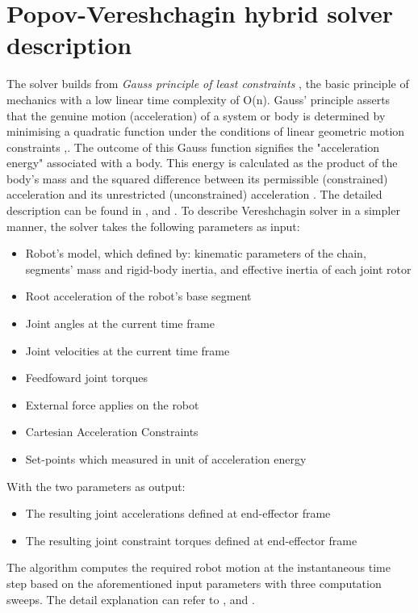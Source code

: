 \documentclass[report.tex]{subfiles}
\begin{document}
    \section{Popov-Vereshchagin hybrid solver description}
    The solver builds from \textit{Gauss principle of least constraints} , the basic principle of mechanics with a low linear time complexity of O(n). Gauss' principle asserts that the genuine motion (acceleration) of a system or body is determined by minimising a quadratic function under the conditions of linear geometric motion constraints \cite{bruyninckx2000gauss},\cite{gauss1829neues}. The outcome of this Gauss function signifies the "acceleration energy" associated with a body. This energy is calculated as the product of the body's mass and the squared difference between its permissible (constrained) acceleration and its unrestricted (unconstrained) acceleration \cite{ramm2011principles}. The detailed description can be found in \cite{vereshchagin1989modeling},\cite{redon2002gauss} and \cite{popov1974control}. To describe Vereshchagin solver in a simpler manner, the solver takes the following parameters as input:
    \begin{itemize}
        \item Robot's model, which defined by: kinematic parameters of the chain, segments' mass and rigid-body inertia, and effective inertia of each joint rotor
        \item Root acceleration of the robot's base segment
        \item Joint angles at the current time frame
        \item Joint velocities at the current time frame
        \item Feedfoward joint torques
        \item External force applies on the robot
        \item Cartesian Acceleration Constraints
        \item Set-points which measured in unit of acceleration energy
    \end{itemize}
    With the two parameters as output:
    \begin{itemize}
        \item The resulting joint accelerations defined at end-effector frame
        \item The resulting joint constraint torques defined at end-effector frame
    \end{itemize}
    The algorithm computes the required robot motion at the instantaneous time step based on the aforementioned input parameters with three computation sweeps. The detail explanation can refer to \cite{vereshchagin1989modeling} ,\cite{schneider2019exploiting} and \cite{kulkarni2019applying}.
\end{document}
